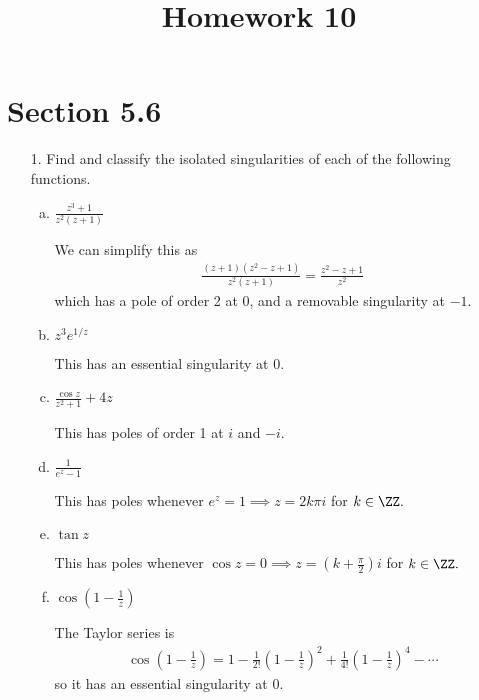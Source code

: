 \documentclass{article}
\begin{document}
\title{Homework 10}
\maketitle
\thispagestyle{fancy}

\section*{Section 5.6}

\begin{itemize}
	\item[1.] Find and classify the isolated singularities of each of the following functions.
		\begin{enumerate}[(a)]
			\item $\frac{z^3+1}{z^2(z+1)}$
				\begin{soln}
					We can simplify this as
					\begin{align*}
						\frac{(z+1)(z^2-z+1)}{z^2(z+1)} = \frac{z^2-z+1}{z^2}
					\end{align*}
					which has a pole of order 2 at 0, and a removable singularity at $-1.$
				\end{soln}

			\item $z^3 e^{1/z}$
				\begin{soln}
					This has an essential singularity at 0.
				\end{soln}

			\item $\frac{\cos z}{z^2+1}+4z$
				\begin{soln}
					This has poles of order 1 at $i$ and $-i.$
				\end{soln}

			\item $\frac{1}{e^z-1}$
				\begin{soln}
					This has poles whenever $e^z=1\implies z=2k\pi i$ for $k\in\ZZ.$
				\end{soln}

			\item $\tan z$
				\begin{soln}
					This has poles whenever $\cos z=0\implies z = \left( k+\frac{\pi}{2} \right)i$ for $k\in\ZZ.$
				\end{soln}

			\item $\cos\left( 1-\frac{1}{z} \right)$
				\begin{soln}
					The Taylor series is
					\begin{align*}
						\cos\left( 1-\frac{1}{z} \right) = 1 - \frac{1}{2!}\left( 1-\frac{1}{z} \right)^2 + \frac{1}{4!}\left( 1-\frac{1}{z} \right)^4 - \cdots
					\end{align*}
					so it has an essential singularity at 0.
				\end{soln}


\end{enumerate}
\end{itemize}
\end{document}
